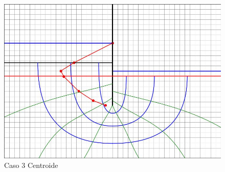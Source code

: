 \begin{figure}[H]
\begin{minipage}{0.32\textwidth}
        \includegraphics[width=\textwidth]{GRAFICOS/caso_3_centroide_y.jpg}
        \caption{Caso 3 Centroide}
    \end{minipage}
\end{figure}


